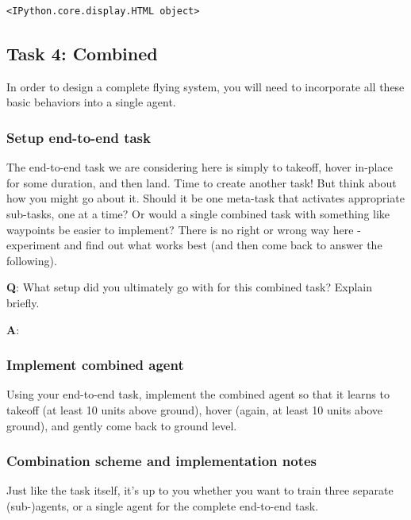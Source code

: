 \documentclass[11pt]{article}
\begin{document}
    
    \begin{verbatim}
<IPython.core.display.HTML object>
    \end{verbatim}

    
    \subsection{Task 4: Combined}\label{task-4-combined}

In order to design a complete flying system, you will need to
incorporate all these basic behaviors into a single agent.

\subsubsection{Setup end-to-end task}\label{setup-end-to-end-task}

The end-to-end task we are considering here is simply to takeoff, hover
in-place for some duration, and then land. Time to create another task!
But think about how you might go about it. Should it be one meta-task
that activates appropriate sub-tasks, one at a time? Or would a single
combined task with something like waypoints be easier to implement?
There is no right or wrong way here - experiment and find out what works
best (and then come back to answer the following).

\textbf{Q}: What setup did you ultimately go with for this combined
task? Explain briefly.

\textbf{A}:

\subsubsection{Implement combined agent}\label{implement-combined-agent}

Using your end-to-end task, implement the combined agent so that it
learns to takeoff (at least 10 units above ground), hover (again, at
least 10 units above ground), and gently come back to ground level.

\subsubsection{Combination scheme and implementation
notes}\label{combination-scheme-and-implementation-notes}

Just like the task itself, it's up to you whether you want to train
three separate (sub-)agents, or a single agent for the complete
end-to-end task.
\end{document}
